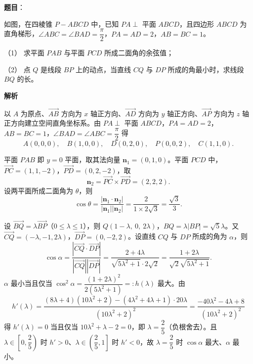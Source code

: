 \begin{answer}

\textbf{题目}：

如图，在四棱锥 \(P-ABCD\) 中，已知 \(PA\perp\) 平面 \(ABCD\)，且四边形 \(ABCD\) 为直角梯形，\(\angle ABC=\angle BAD=\dfrac{\pi}{2}\)，\(PA=AD=2\)，\(AB=BC=1\)。

（1） 求平面 \(PAB\) 与平面 \(PCD\) 所成二面角的余弦值；

（2） 点 \(Q\) 是线段 \(BP\) 上的动点，当直线 \(CQ\) 与 \(DP\) 所成的角最小时，求线段 \(BQ\) 的长。
\nopagebreak[4]
\begin{center}\end{center}
\nopagebreak[4]
\textbf{解析}

以 \(A\) 为原点、\(\overrightarrow{AB}\) 方向为 \(x\) 轴正方向、\(\overrightarrow{AD}\) 方向为 \(y\) 轴正方向、\(\overrightarrow{AP}\) 方向为 \(z\) 轴正方向建立空间直角坐标系。由 \(PA\perp\) 平面 \(ABCD\)，\(PA=AD=2\)，\(AB=BC=1\)，\(\angle BAD=\angle ABC=\dfrac{\pi}{2}\) 得
\nopagebreak[4]
\[
A(0,0,0),\quad B(1,0,0),\quad D(0,2,0),\quad P(0,0,2),\quad C(1,1,0).
\]


平面 \(PAB\) 即 \(y=0\) 平面，取其法向量 \(\boldsymbol n_{1}=(0,1,0)\)。平面 \(PCD\) 中，\(\overrightarrow{PC}=(1,1,-2)\)，\(\overrightarrow{PD}=(0,2,-2)\)，取
\nopagebreak[4]
\[
\boldsymbol n_{2}=\overrightarrow{PC}\times\overrightarrow{PD}=(2,2,2).
\]
设两平面所成二面角为 \(\theta\)，则
\nopagebreak[4]
\[
\cos\theta=\frac{|\boldsymbol n_{1}\cdot\boldsymbol n_{2}|}{|\boldsymbol n_{1}||\boldsymbol n_{2}|}=\frac{2}{1\times2\sqrt{3}}=\frac{\sqrt{3}}{3}.
\]


设 \(\overrightarrow{BQ}=\lambda\overrightarrow{BP}\)（\(0\leqslant\lambda\leqslant1\)），则 \(Q(1-\lambda,\ 0,\ 2\lambda)\)，\(BQ=\lambda|BP|=\sqrt{5}\lambda\)。又 \(\overrightarrow{CQ}=(-\lambda,-1,2\lambda)\)，\(\overrightarrow{DP}=(0,-2,2)\)。设直线 \(CQ\) 与 \(DP\) 所成的角为 \(\alpha\)，则
\nopagebreak[4]
\[
\cos\alpha=\frac{\left|\overrightarrow{CQ}\cdot\overrightarrow{DP}\right|}{|\overrightarrow{CQ}||\overrightarrow{DP}|}=\frac{2+4\lambda}{\sqrt{5\lambda^{2}+1}\cdot2\sqrt{2}}=\frac{1+2\lambda}{\sqrt{2}\sqrt{5\lambda^{2}+1}}.
\]
\(\alpha\) 最小当且仅当 \(\cos^{2}\alpha=\dfrac{(1+2\lambda)^{2}}{2(5\lambda^{2}+1)}=:h(\lambda)\) 最大。由
\nopagebreak[4]
\[
h'(\lambda)=\frac{(8\lambda+4)(10\lambda^{2}+2)-(4\lambda^{2}+4\lambda+1)\cdot20\lambda}{(10\lambda^{2}+2)^{2}}=\frac{-40\lambda^{2}-4\lambda+8}{(10\lambda^{2}+2)^{2}}
\]
得 \(h'(\lambda)=0\) 当且仅当 \(10\lambda^{2}+\lambda-2=0\)，即 \(\lambda=\dfrac{2}{5}\)（负根舍去）。且 \(\lambda\in\left[0,\dfrac{2}{5}\right)\) 时 \(h'>0\)、\(\lambda\in\left(\dfrac{2}{5},1\right]\) 时 \(h'<0\)，故 \(\lambda=\dfrac{2}{5}\) 时 \(\cos\alpha\) 最大、\(\alpha\) 最小。


\end{answer}
